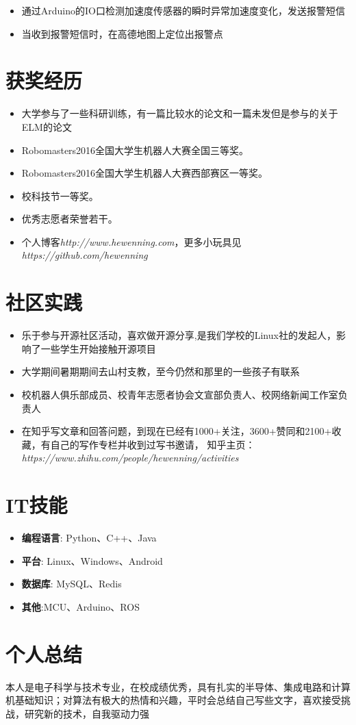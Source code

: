 \documentclass{resume}
\begin{document}
\begin{itemize}
	\item 通过Arduino的IO口检测加速度传感器的瞬时异常加速度变化，发送报警短信
	\item 当收到报警短信时，在高德地图上定位出报警点
\end{itemize}




\section{获奖经历}
\begin{itemize}[parsep=0.2ex]
  \item 大学参与了一些科研训练，有一篇比较水的论文和一篇未发但是参与的关于ELM的论文
  \item Robomasters2016全国大学生机器人大赛全国三等奖。
  \item Robomasters2016全国大学生机器人大赛西部赛区一等奖。
  \item 校科技节一等奖。
  \item 优秀志愿者荣誉若干。
  \item 个人博客\textit{http://www.hewenning.com}，更多小玩具见 \textit{https://github.com/hewenning}
\end{itemize}



\section{社区实践}
\begin{itemize}[parsep=0.2ex]
  \item 乐于参与开源社区活动，喜欢做开源分享,是我们学校的Linux社的发起人，影响了一些学生开始接触开源项目
  \item 大学期间暑期期间去山村支教，至今仍然和那里的一些孩子有联系
  \item 校机器人俱乐部成员、校青年志愿者协会文宣部负责人、校网络新闻工作室负责人
  \item 在知乎写文章和回答问题，到现在已经有1000+关注，3600+赞同和2100+收藏，有自己的写作专栏并收到过写书邀请，
  知乎主页：\textit{https://www.zhihu.com/people/hewenning/activities}
\end{itemize}



\section{IT技能}
\begin{itemize}[parsep=0.2ex]
	\item \textbf{编程语言}: Python、C++、Java
	\item \textbf{平台}: Linux、Windows、Android
	\item \textbf{数据库}: MySQL、Redis
	\item \textbf{其他}:MCU、Arduino、ROS
\end{itemize}



\section{个人总结}
本人是电子科学与技术专业，在校成绩优秀，具有扎实的半导体、集成电路和计算机基础知识；对算法有极大的热情和兴趣，平时会总结自己写些文字，喜欢接受挑战，研究新的技术，自我驱动力强
\end{document}

